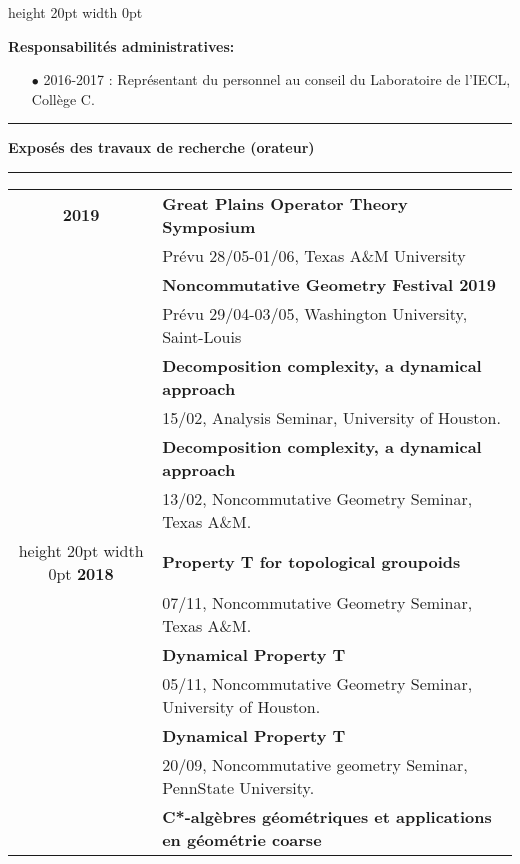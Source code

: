\documentclass[a4paper,11pt]{article}
\newcommand\espace{\vrule height 20pt width 0pt}
\newcommand{\titre}[1]{%
	\begin{center}
	\bigskip
	\rule{\textwidth}{1pt}
	\par\vspace{0.1cm}
        \textbf{\large #1}
	\par\rule{\textwidth}{1pt}
	\end{center}
	\bigskip
	}
\begin{document}
\espace

\textbf{Responsabilit\'es administratives:} \\
\begin{itemize}
\item[$\bullet$] 2016-2017 : Représentant du personnel au conseil du Laboratoire de l'IECL, Collège C.\\
\end{itemize}

\newpage
\titre{Expos\'es des travaux de recherche (orateur)}

\begin{tabular}{cp{}}

\textbf{2019} 			& \textbf{Great Plains Operator Theory Symposium}\\
				& Pr\'evu 28/05-01/06, Texas A\&M University \\   
				& \textbf{Noncommutative Geometry Festival 2019}\\	
				& Pr\'evu 29/04-03/05, Washington University, Saint-Louis \\ %
				& \textbf{Decomposition complexity, a dynamical approach}\\
				& 15/02, Analysis Seminar, University of Houston. \\ %
				& \textbf{Decomposition complexity, a dynamical approach}\\
				& 13/02, Noncommutative Geometry Seminar, Texas A\&M.  \\ %
				\espace
\textbf{2018} & \textbf{Property T for topological groupoids}\\
				& 07/11, Noncommutative Geometry Seminar, Texas A\&M. \\ %
				& \textbf{Dynamical Property T}\\
				& 05/11, Noncommutative Geometry Seminar, University of Houston. \\ %
				& \textbf{Dynamical Property T}\\
				& 20/09, Noncommutative geometry Seminar, PennState University.\\
				& \textbf{C*-alg\`ebres g\'eom\'etriques et applications en g\'eom\'etrie coarse}\\

\end{tabular}
\end{document}
